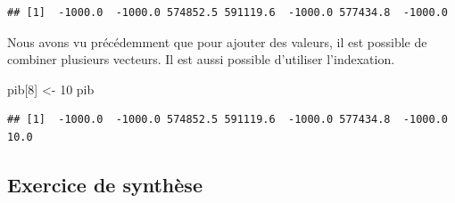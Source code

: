 \documentclass[
  11pt,
]{book}
\newenvironment{Shaded}{\begin{snugshade}}{\end{snugshade}}
\newcommand{\DecValTok}[1]{\textcolor[rgb]{0.00,0.00,0.81}{#1}}
\newcommand{\NormalTok}[1]{#1}
\newcommand{\OtherTok}[1]{\textcolor[rgb]{0.56,0.35,0.01}{#1}}
\numberwithin{equation}{section}
\numberwithin{countremarque}{section}
\begin{document}
\begin{lstlisting}
## [1]  -1000.0  -1000.0 574852.5 591119.6  -1000.0 577434.8  -1000.0
\end{lstlisting}

Nous avons vu précédemment que pour ajouter des valeurs, il est possible de combiner plusieurs vecteurs. Il est aussi possible d'utiliser l'indexation.

\begin{Shaded}
\begin{Highlighting}[]
\NormalTok{pib[}\DecValTok{8}\NormalTok{] }\OtherTok{\textless{}{-}} \DecValTok{10}
\NormalTok{pib}
\end{Highlighting}
\end{Shaded}

\begin{lstlisting}
## [1]  -1000.0  -1000.0 574852.5 591119.6  -1000.0 577434.8  -1000.0     10.0
\end{lstlisting}

\hypertarget{exercice-de-synthuxe8se}{%
\subsection{Exercice de synthèse}\label{exercice-de-synthuxe8se}}
\end{document}
